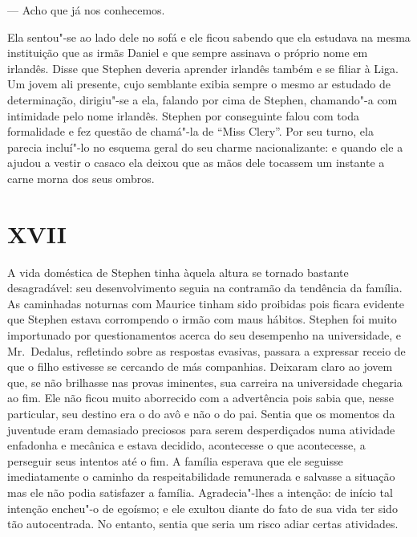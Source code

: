 --- Acho que já nos conhecemos.

Ela sentou"-se ao lado dele no sofá e ele ficou sabendo que ela estudava
na mesma instituição que as irmãs Daniel e que sempre assinava o
próprio nome em irlandês.  Disse que Stephen deveria \label{aprender"-irlandes} aprender irlandês
também e se filiar à Liga.  Um jovem ali presente, cujo
semblante exibia sempre o mesmo ar estudado de determinação, dirigiu"-se
a ela, falando por cima de Stephen, chamando"-a com intimidade pelo nome
irlandês.  Stephen por conseguinte falou com toda formalidade e fez
questão de chamá"-la de “Miss Clery”.  Por seu turno, ela parecia
incluí"-lo no \label{esquema"-geral} esquema geral do seu charme nacionalizante: e quando ele
a ajudou a vestir o casaco ela deixou que as mãos dele tocassem um
instante a carne morna dos seus ombros.


\section*{XVII}

A vida doméstica de Stephen tinha àquela altura se tornado bastante
desagradável: seu desenvolvimento seguia na contramão da
tendência da família.  As caminhadas noturnas com Maurice tinham sido
proibidas pois ficara evidente que Stephen estava corrompendo o irmão
com maus hábitos.  Stephen foi muito importunado por questionamentos
acerca do seu desempenho na universidade, e Mr.~Dedalus, refletindo
sobre as respostas evasivas, passara a expressar receio de que o filho
estivesse se cercando de más companhias.  Deixaram claro ao jovem
que, se não brilhasse nas provas iminentes, sua carreira na
universidade chegaria ao fim.  Ele não ficou muito aborrecido com a
advertência pois sabia que, nesse particular, seu destino era o do avô
e não o do pai.  Sentia que os momentos da juventude eram demasiado
preciosos para serem desperdiçados numa atividade enfadonha e mecânica
e estava decidido, acontecesse o que acontecesse, a perseguir seus
intentos até o fim.  A família esperava que ele seguisse imediatamente
o caminho da respeitabilidade remunerada e salvasse a situação mas ele
não podia satisfazer a família.  Agradecia"-lhes a intenção: de início
tal intenção encheu"-o de egoísmo; e ele exultou diante do fato de sua
vida ter sido tão autocentrada.  No entanto, sentia que \label{seria"-um} seria
um risco adiar certas atividades.

